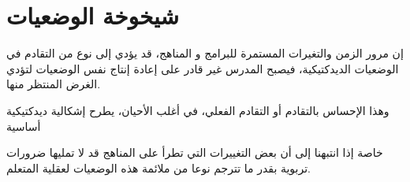 \documentclass[16pt]{beamer}
\begin{document}
\section{شيخوخة الوضعيات}

\begin{frame}{}


\begin{block}{}
إن مرور الزمن والتغيرات المستمرة للبرامج و المناهج، قد يؤدي إلى نوع من التقادم في الوضعيات الديدكتيكية، فيصبح المدرس غير قادر على إعادة إنتاج نفس الوضعيات لتؤدي الغرض المنتظر منها.

\end{block}
\pause
\begin{block}{}
 وهذا الإحساس بالتقادم أو التقادم الفعلي، في أغلب الأحيان، يطرح إشكالية ديدكتيكية أساسية
 \end{block}
 \begin{block}{}
 خاصة إذا انتبهنا إلى أن بعض التغييرات التي تطرأ على المناهج قد لا تمليها ضرورات تربوية بقدر ما تترجم نوعا من ملائمة هذه الوضعيات لعقلية المتعلم.
\end{block}
\end{frame}
%
\section*{}
%
\begin{frame}
\begin{center}
\end{center}
\end{frame}
\end{document}

